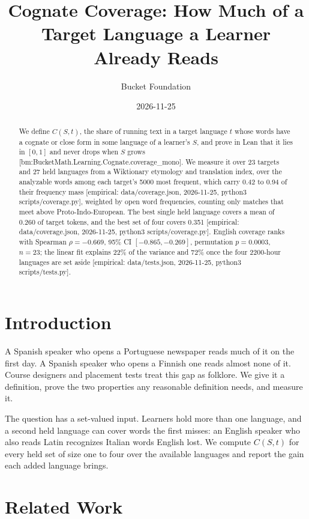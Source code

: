 \documentclass[11pt]{article}
\title{Cognate Coverage: How Much of a Target Language a Learner Already Reads}
\author{Bucket Foundation}
\date{2026-11-25}
\newcommand{\emp}[1]{{\small[empirical: #1]}}
\newcommand{\bm}[1]{{\small[bm:#1]}}
\newcommand{\covrun}{data/coverage.json, 2026-11-25, python3 scripts/coverage.py}
\begin{document}
\maketitle

\begin{abstract}
We define  $C(S,t)$, the share of running
text in a target language $t$ whose words have a cognate or close form in
some language of a learner's  $S$, and prove in Lean
that it lies in $[0,1]$ and never drops when $S$ grows
\bm{BucketMath.Learning.Cognate.coverage\_mono}. We measure it over 23
targets and 27 held languages from a Wiktionary etymology and translation
index, over the analyzable words among each target's 5000 most frequent,
which carry 0.42 to 0.94 of their frequency mass \emp{\covrun}, weighted
by open word frequencies, counting only matches that
meet above Proto-Indo-European. The best single held language covers a
mean of 0.260 of target tokens, and the best set of four covers 0.351
\emp{\covrun}.
English coverage ranks  with Spearman $\rho=-0.669$, 95\% CI $[-0.865,-0.269]$, permutation $p=0.0003$, $n=23$; the linear fit explains 22\% of the variance and 72\% once the four 2200-hour languages are set aside [empirical: data/tests.json, 2026-11-25, python3 scripts/tests.py].
\end{abstract}

\section{Introduction}
\label{sec:intro}

A Spanish speaker who opens a Portuguese newspaper reads much of it on
the first day. A Spanish speaker who opens a Finnish one reads almost
none of it. Course designers and placement tests treat this gap as
folklore. We give it a definition, prove the two properties any
reasonable definition needs, and measure it.

The question has a set-valued input. Learners hold more than one
language, and a second held language can cover words the first misses: an
English speaker who also reads Latin recognizes Italian words English
lost. We compute $C(S,t)$ for every held set of size one to four over the
available languages and report the gain each added language brings.

\section{Related Work}
\label{sec:related}
\end{document}

